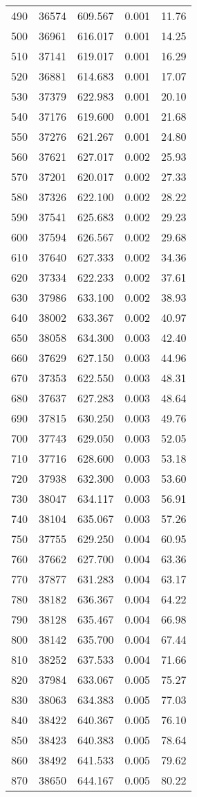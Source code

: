 \begin{longtable}{ccccc}
490 & 36574 & 609.567 & 0.001 & 11.76 \\
500 & 36961 & 616.017 & 0.001 & 14.25 \\
510 & 37141 & 619.017 & 0.001 & 16.29 \\
520 & 36881 & 614.683 & 0.001 & 17.07 \\
530 & 37379 & 622.983 & 0.001 & 20.10 \\
540 & 37176 & 619.600 & 0.001 & 21.68 \\
550 & 37276 & 621.267 & 0.001 & 24.80 \\
560 & 37621 & 627.017 & 0.002 & 25.93 \\
570 & 37201 & 620.017 & 0.002 & 27.33 \\
580 & 37326 & 622.100 & 0.002 & 28.22 \\
590 & 37541 & 625.683 & 0.002 & 29.23 \\
600 & 37594 & 626.567 & 0.002 & 29.68 \\
610 & 37640 & 627.333 & 0.002 & 34.36 \\
620 & 37334 & 622.233 & 0.002 & 37.61 \\
630 & 37986 & 633.100 & 0.002 & 38.93 \\
640 & 38002 & 633.367 & 0.002 & 40.97 \\
650 & 38058 & 634.300 & 0.003 & 42.40 \\
660 & 37629 & 627.150 & 0.003 & 44.96 \\
670 & 37353 & 622.550 & 0.003 & 48.31 \\
680 & 37637 & 627.283 & 0.003 & 48.64 \\
690 & 37815 & 630.250 & 0.003 & 49.76 \\
700 & 37743 & 629.050 & 0.003 & 52.05 \\
710 & 37716 & 628.600 & 0.003 & 53.18 \\
720 & 37938 & 632.300 & 0.003 & 53.60 \\
730 & 38047 & 634.117 & 0.003 & 56.91 \\
740 & 38104 & 635.067 & 0.003 & 57.26 \\
750 & 37755 & 629.250 & 0.004 & 60.95 \\
760 & 37662 & 627.700 & 0.004 & 63.36 \\
770 & 37877 & 631.283 & 0.004 & 63.17 \\
780 & 38182 & 636.367 & 0.004 & 64.22 \\
790 & 38128 & 635.467 & 0.004 & 66.98 \\
800 & 38142 & 635.700 & 0.004 & 67.44 \\
810 & 38252 & 637.533 & 0.004 & 71.66 \\
820 & 37984 & 633.067 & 0.005 & 75.27 \\
830 & 38063 & 634.383 & 0.005 & 77.03 \\
840 & 38422 & 640.367 & 0.005 & 76.10 \\
850 & 38423 & 640.383 & 0.005 & 78.64 \\
860 & 38492 & 641.533 & 0.005 & 79.62 \\
870 & 38650 & 644.167 & 0.005 & 80.22 \\
\bottomrule
\end{longtable}


